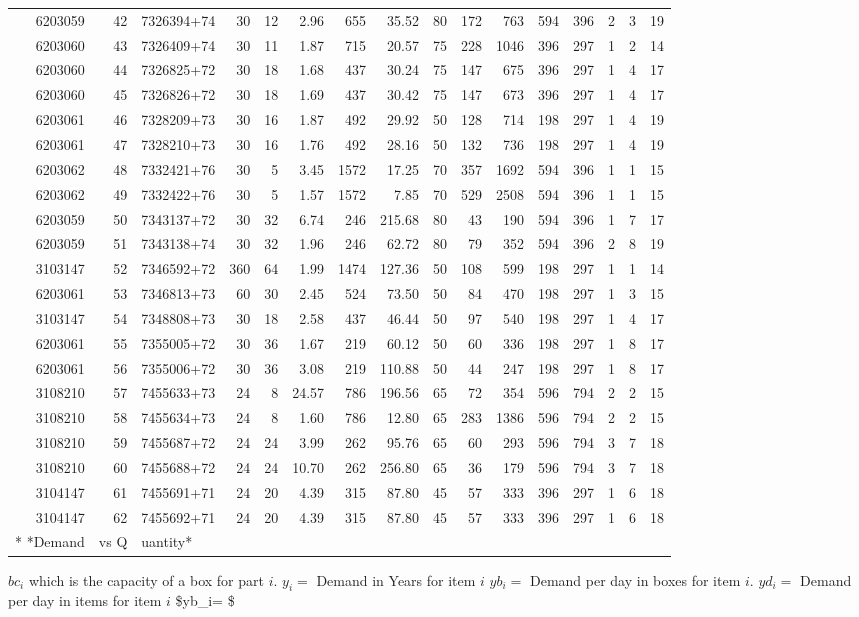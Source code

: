 \documentclass[
]{article}
\begin{document}
\begin{longtable}[]{@{}rrlrrrrrrrrrrrrr@{}}
6203059 & 42 & 7326394+74 & 30 & 12 & 2.96 & 655 & 35.52 & 80 & 172 &
763 & 594 & 396 & 2 & 3 & 19\tabularnewline
6203060 & 43 & 7326409+74 & 30 & 11 & 1.87 & 715 & 20.57 & 75 & 228 &
1046 & 396 & 297 & 1 & 2 & 14\tabularnewline
6203060 & 44 & 7326825+72 & 30 & 18 & 1.68 & 437 & 30.24 & 75 & 147 &
675 & 396 & 297 & 1 & 4 & 17\tabularnewline
6203060 & 45 & 7326826+72 & 30 & 18 & 1.69 & 437 & 30.42 & 75 & 147 &
673 & 396 & 297 & 1 & 4 & 17\tabularnewline
6203061 & 46 & 7328209+73 & 30 & 16 & 1.87 & 492 & 29.92 & 50 & 128 &
714 & 198 & 297 & 1 & 4 & 19\tabularnewline
6203061 & 47 & 7328210+73 & 30 & 16 & 1.76 & 492 & 28.16 & 50 & 132 &
736 & 198 & 297 & 1 & 4 & 19\tabularnewline
6203062 & 48 & 7332421+76 & 30 & 5 & 3.45 & 1572 & 17.25 & 70 & 357 &
1692 & 594 & 396 & 1 & 1 & 15\tabularnewline
6203062 & 49 & 7332422+76 & 30 & 5 & 1.57 & 1572 & 7.85 & 70 & 529 &
2508 & 594 & 396 & 1 & 1 & 15\tabularnewline
6203059 & 50 & 7343137+72 & 30 & 32 & 6.74 & 246 & 215.68 & 80 & 43 &
190 & 594 & 396 & 1 & 7 & 17\tabularnewline
6203059 & 51 & 7343138+74 & 30 & 32 & 1.96 & 246 & 62.72 & 80 & 79 & 352
& 594 & 396 & 2 & 8 & 19\tabularnewline
3103147 & 52 & 7346592+72 & 360 & 64 & 1.99 & 1474 & 127.36 & 50 & 108 &
599 & 198 & 297 & 1 & 1 & 14\tabularnewline
6203061 & 53 & 7346813+73 & 60 & 30 & 2.45 & 524 & 73.50 & 50 & 84 & 470
& 198 & 297 & 1 & 3 & 15\tabularnewline
3103147 & 54 & 7348808+73 & 30 & 18 & 2.58 & 437 & 46.44 & 50 & 97 & 540
& 198 & 297 & 1 & 4 & 17\tabularnewline
6203061 & 55 & 7355005+72 & 30 & 36 & 1.67 & 219 & 60.12 & 50 & 60 & 336
& 198 & 297 & 1 & 8 & 17\tabularnewline
6203061 & 56 & 7355006+72 & 30 & 36 & 3.08 & 219 & 110.88 & 50 & 44 &
247 & 198 & 297 & 1 & 8 & 17\tabularnewline
3108210 & 57 & 7455633+73 & 24 & 8 & 24.57 & 786 & 196.56 & 65 & 72 &
354 & 596 & 794 & 2 & 2 & 15\tabularnewline
3108210 & 58 & 7455634+73 & 24 & 8 & 1.60 & 786 & 12.80 & 65 & 283 &
1386 & 596 & 794 & 2 & 2 & 15\tabularnewline
3108210 & 59 & 7455687+72 & 24 & 24 & 3.99 & 262 & 95.76 & 65 & 60 & 293
& 596 & 794 & 3 & 7 & 18\tabularnewline
3108210 & 60 & 7455688+72 & 24 & 24 & 10.70 & 262 & 256.80 & 65 & 36 &
179 & 596 & 794 & 3 & 7 & 18\tabularnewline
3104147 & 61 & 7455691+71 & 24 & 20 & 4.39 & 315 & 87.80 & 45 & 57 & 333
& 396 & 297 & 1 & 6 & 18\tabularnewline
3104147 & 62 & 7455692+71 & 24 & 20 & 4.39 & 315 & 87.80 & 45 & 57 & 333
& 396 & 297 & 1 & 6 & 18\tabularnewline
* *Demand & vs Q & uantity* & & & & & & & & & & & & &\tabularnewline
\bottomrule
\end{longtable}

\(bc_i\) which is the capacity of a box for part \(i\). \(y_i=\) Demand
in Years for item \(i\) \(yb_i=\) Demand per day in boxes for item
\(i\). \(yd_i=\) Demand per day in items for item \(i\) \$yb\_i=
 \$
\end{document}
